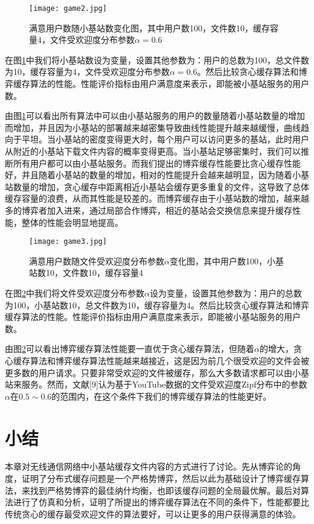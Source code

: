 \documentclass[bachelor]{seuthesis} %
\begin{document}
\begin{Main}
\begin{figure}{}
\centering
\texttt{[image: game2.jpg]}
\caption{满意用户数随小基站数变化图，其中用户数100，文件数10，缓存容量4，文件受欢迎度分布参数$\alpha=0.6$}\label{gp2}
\end{figure}
在图\ref{gp2}中我们将小基站数设为变量，设置其他参数为：用户的总数为100，总文件数为10，缓存容量为4，文件受欢迎度分布参数$\alpha=0.6$。然后比较贪心缓存算法和博弈缓存算法的性能。性能评价指标由用户满意度来表示，即能被小基站服务的用户数。\par
由图\ref{gp2}可以看出所有算法中可以由小基站服务的用户的数量随着小基站数量的增加而增加，并且因为小基站的部署越来越密集导致曲线性能提升越来越缓慢，曲线趋向于平坦。当小基站的密度变得更大时，每个用户可以访问更多的基站，此时用户从附近的小基站下载文件内容的概率变得更高。当小基站足够密集时，我们可以推断所有用户都可以由小基站服务。而我们提出的博弈缓存性能要比贪心缓存性能好，并且随着小基站的数量的增加，相对的性能提升会越来越明显，因为随着小基站数量的增加，贪心缓存中距离相近小基站会缓存更多重复的文件，这导致了总体缓存容量的浪费，从而其性能是较差的。而博弈缓存由于小基站数的增加，越来越多的博弈者加入进来，通过局部合作博弈，相近的基站会交换信息来提升缓存性能，整体的性能会明显地提高。\par
\begin{figure}{}
\centering
\texttt{[image: game3.jpg]}
\caption{满意用户数随文件受欢迎度分布参数$\alpha$变化图，其中用户数100，小基站数10，文件数10，缓存容量4}\label{gp3}
\end{figure}
在图\ref{gp3}中我们将文件受欢迎度分布参数$\alpha$设为变量，设置其他参数为：用户的总数为100，小基站数10，总文件数为10，缓存容量为4。然后比较贪心缓存算法和博弈缓存算法的性能。性能评价指标由用户满意度来表示，即能被小基站服务的用户数。\par
由图\ref{gp3}可以看出博弈缓存算法性能要一直优于贪心缓存算法，但随着$\alpha$的增大，贪心缓存算法和博弈缓存算法性能越来越接近，这是因为前几个很受欢迎的文件会被更多数的用户请求。只要非常受欢迎的文件被缓存，那么大多数请求都可以由小基站来服务。然而，文献[9]认为基于YouTube数据的文件受欢迎度Zipf分布中的参数$\alpha$在$0.5\sim0.6$的范围内，在这个条件下我们的博弈缓存算法的性能更好。\par
\section{小结}
本章对无线通信网络中小基站缓存文件内容的方式进行了讨论。先从博弈论的角度，证明了分布式缓存问题是一个严格势博弈，然后以此为基础设计了博弈缓存算法，来找到严格势博弈的最佳纳什均衡，也即该缓存问题的全局最优解。最后对算法进行了仿真和分析，证明了所提出的博弈缓存算法在不同的条件下，性能都要比传统贪心的缓存最受欢迎文件的算法要好，可以让更多的用户获得满意的体验。

\end{Main}
\end{document}

